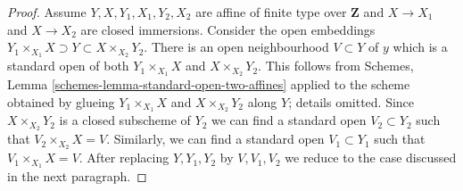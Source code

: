 \begin{proof}
\medskip\noindent
Assume $Y, X, Y_1, X_1, Y_2, X_2$ are affine of finite type over
$\mathbf{Z}$ and $X \to X_1$ and $X \to X_2$ are closed immersions.
Consider the open embeddings
$Y_1 \times_{X_1} X \supset Y \subset X \times_{X_2} Y_2$.
There is an open neighbourhood $V \subset Y$ of $y$ which is a
standard open of both $Y_1 \times_{X_1} X$ and $X \times_{X_2} Y_2$.
This follows from Schemes, Lemma \ref{schemes-lemma-standard-open-two-affines}
applied to the scheme obtained by glueing $Y_1 \times_{X_1} X$ and
$X \times_{X_2} Y_2$ along $Y$; details omitted.
Since $X \times_{X_2} Y_2$ is a closed subscheme of $Y_2$
we can find a standard open $V_2 \subset Y_2$ such that
$V_2 \times_{X_2} X = V$. Similarly, we can find a standard open
$V_1 \subset Y_1$ such that $V_1 \times_{X_1} X = V$.
After replacing $Y, Y_1, Y_2$ by $V, V_1, V_2$ we reduce to the
case discussed in the next paragraph.


\end{proof}
